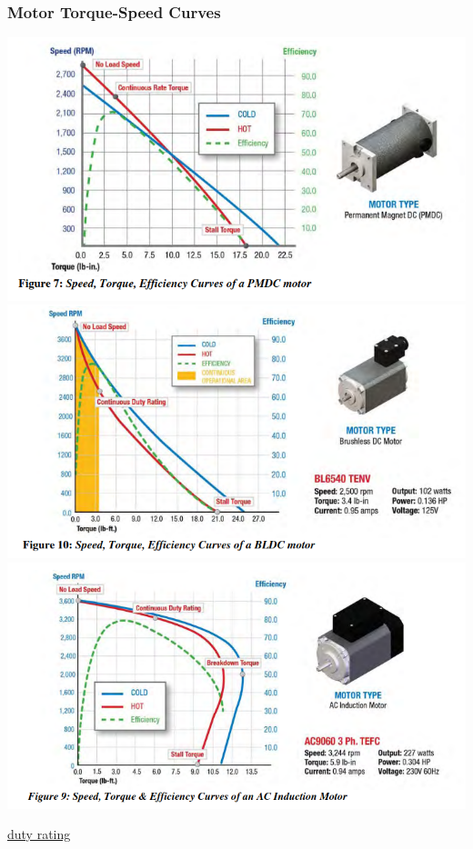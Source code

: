 \documentclass[fleqn]{beamer} %
\newcommand{\sectiontitleIII}{Motor Torque-Speed Curves}
\begin{document}
	\begin{frame}[label=sectionIII] \small
		\frametitle{\sectiontitleIII}
	 		

		\includegraphics[scale=.2]{images/torque_speed_pmdc.png}
        \includegraphics[scale=.2]{images/torque_speed_bldc.png}\includegraphics[scale=.2]{images/torque_speed_ac.png} 

        \href{https://myelectrical.com/notes/entryid/106/understanding-motor-duty-rating}{duty rating}

		\end{frame}  
	
\end{document}
